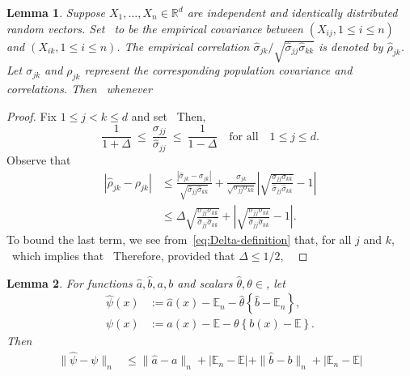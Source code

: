 \documentclass{article}
\let\hat\widehat
\newtheorem{lemma}{Lemma}
\begin{document}
\begin{appendices}
 
 \begin{lemma}\label{lem:correlations-from-covariances}
 Suppose $X_1, \ldots, X_n\in\mathbb{R}^d$ are independent and identically distributed random vectors. Set
 \
 to be the empirical covariance between $(X_{ij}, 1\le i\le n)$ and $(X_{ik}, 1\le i\le n)$. The empirical correlation $\widehat{\sigma}_{jk}/\sqrt{\widehat{\sigma}_{jj}\widehat{\sigma}_{kk}}$ is denoted by $\widehat{\rho}_{jk}$. Let $\sigma_{jk}$ and $\rho_{jk}$ represent the corresponding population covariance and correlations. Then
 \
 whenever
 \
 \end{lemma}
 \begin{proof}
 Fix $1\le j < k\le d$ and set
 \
 Then,
 \begin{equation}\label{eq:Delta-definition}
  \frac{1}{1 + \Delta} ~\le~ \frac{\sigma_{jj}}{\widehat{\sigma}_{jj}} ~\le~ \frac{1}{1-\Delta}\quad\mbox{for all}\quad 1\le j\le d.
 \end{equation}
 Observe that
 \begin{align*}
 \left|\widehat{\rho}_{jk} - \rho_{jk}\right| &\le \frac{|\widehat{\sigma}_{jk} - \sigma_{jk}|}{\sqrt{\widehat{\sigma}_{jj}\widehat{\sigma}_{kk}}} + \frac{\sigma_{jk}}{\sqrt{\sigma_{jj}\sigma_{kk}}}\left|\sqrt{\frac{\sigma_{jj}\sigma_{kk}}{\widehat{\sigma}_{jj}\widehat{\sigma}_{kk}}} - 1\right|\\
 &\le \Delta\sqrt{\frac{\sigma_{jj}\sigma_{kk}}{\widehat{\sigma}_{jj}\widehat{\sigma}_{kk}}} + \left|\sqrt{\frac{\sigma_{jj}\sigma_{kk}}{\widehat{\sigma}_{jj}\widehat{\sigma}_{kk}}} - 1\right|.
 \end{align*}
 To bound the last term, we see from~\eqref{eq:Delta-definition} that, for all $j$ and $k$,
 \
 which implies that
 \
 Therefore, provided that $\Delta \leq 1/2$,
 \
 \end{proof}
 \begin{lemma}\label{lem:psihat-minus-psi-part1}
 For functions $\widehat{a}, \widehat{b}, a, b$ and scalars $\hat{\theta}, \theta\in$, let
 \begin{align*}
 \widehat{\psi}(x) &:= \widehat{a}(x) - \mathbb{E}_n - \widehat{\theta}\left\{\widehat{b} - \mathbb{E}_n\right\},\\
 \psi(x) &:= a(x) - \mathbb{E} - \theta\left\{b(x) - \mathbb{E}\right\}.
 \end{align*}
 Then
 \begin{align*}
 \|\widehat{\psi} - \psi\|_{n} &\le \|\widehat{a} - a\|_n + |\mathbb{E}_n - \mathbb{E}| + \|\widehat{b} - b\|_n + |\mathbb{E}_n - \mathbb{E}|\\

\end{align*}
\end{lemma}
\end{appendices}
\end{document}
